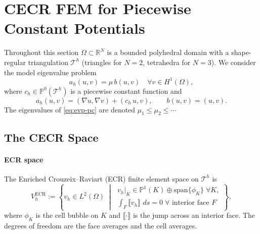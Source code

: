 \documentclass[11pt]{article}
\theoremstyle{plain}
\theoremstyle{definition}
\theoremstyle{remark}
\newcommand{\R}{\mathbb{R}}
\newcommand{\ds}{\,ds}
\newcommand{\ECR}{\mathrm{ECR}}
\newcommand{\jump}[1]{\llbracket #1 \rrbracket}
\begin{document}
\section{CECR FEM for Piecewise Constant Potentials}
\label{sec:cecr}

Throughout this section $\Omega \subset \R^N$ is a bounded polyhedral
domain with a shape-regular triangulation $\mathcal{T}^h$
(triangles for $N=2$, tetrahedra for $N=3$).
We consider the model eigenvalue problem
\begin{equation}
\label{eq:evp-pc}
  a_h(u,v) = \mu\,b(u,v) \quad \forall v \in H^1(\Omega),
\end{equation}
where $c_h \in \mathbb{P}^0(\mathcal{T}^h)$ is a piecewise constant
function and
\begin{equation}
\label{eq:forms-pc}
  a_h(u,v) = (\nabla u,\nabla v) + (c_h\,u,v),
  \qquad b(u,v) = (u,v).
\end{equation}
The eigenvalues of \eqref{eq:evp-pc} are denoted
$\mu_1 \le \mu_2 \le \cdots$

\subsection{The CECR Space}
\label{subsec:cecr-space}

\paragraph{ECR space}
The Enriched Crouzeix--Raviart (ECR) finite element space on
$\mathcal{T}^h$ is
\begin{equation}
\label{eq:ecr-space}
  V_h^{\ECR} := \left\{
    v_h \in L^2(\Omega) \;\middle|\;
    \begin{array}{l}
      v_h|_K \in \mathbb{P}^1(K) \oplus \mathrm{span}\{\phi_K\}\;\forall K,\\[3pt]
      \displaystyle\int_F \jump{v_h}\,\ds = 0\;\forall \text{ interior face } F
    \end{array}
  \right\},
\end{equation}
where $\phi_K$ is the cell bubble on $K$ and $\jump{\cdot}$ is the
jump across an interior face.
The degrees of freedom are the face averages and the cell averages.
\end{document}
